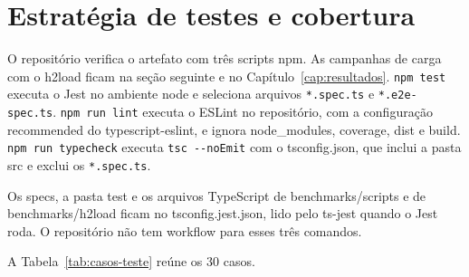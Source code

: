 \section{Estratégia de testes e cobertura}\label{sec:estrategia-testes}

O repositório verifica o artefato com três scripts npm. As campanhas de carga com o h2load ficam na seção seguinte e no Capítulo~\ref{cap:resultados}. \texttt{npm test} executa o Jest no ambiente node e seleciona arquivos \texttt{*.spec.ts} e \texttt{*.e2e-spec.ts}. \texttt{npm run lint} executa o ESLint no repositório, com a configuração recommended do typescript-eslint, e ignora node\_modules, coverage, dist e build. \texttt{npm run typecheck} executa \texttt{tsc -{}-noEmit} com o tsconfig.json, que inclui a pasta src e exclui os \texttt{*.spec.ts}.

Os specs, a pasta test e os arquivos TypeScript de benchmarks/\allowbreak scripts e de benchmarks/\allowbreak h2load ficam no tsconfig.jest.json, lido pelo ts-jest quando o Jest roda. O repositório não tem workflow para esses três comandos.

A Tabela~\ref{tab:casos-teste} reúne os 30 casos.

